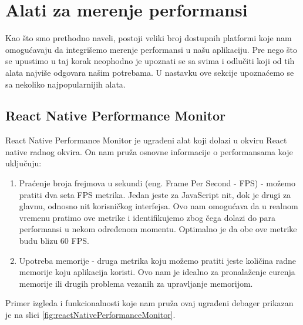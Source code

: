 \documentclass[12pt,oneside]{memoir}
\begin{document}
\section{Alati za merenje performansi}

Kao što smo prethodno naveli, postoji veliki broj dostupnih platformi koje nam omogućavaju da integrišemo merenje performansi u našu aplikaciju. Pre nego što se upustimo u taj korak neophodno je upoznati se sa svima i odlučiti koji od tih alata najviše odgovara našim potrebama. U nastavku ove sekcije upoznaćemo se sa nekoliko najpopularnijih alata.

\subsection{React Native Performance Monitor}

React Native Performance Monitor je ugrađeni alat koji dolazi u okviru React native radnog okvira. On nam pruža osnovne informacije o performansama koje uključuju:

\begin{enumerate}
    \item Praćenje broja frejmova u sekundi (eng. Frame Per Second - FPS) - možemo pratiti dva seta FPS metrika. Jedan jeste za JavaScript nit, dok je drugi za glavnu, odnosno nit korisničkog interfejsa. Ovo nam omogućava da u realnom vremenu pratimo ove metrike i identifikujemo zbog čega dolazi do para performansi u nekom određenom momentu. Optimalno je da obe ove metrike budu blizu 60 FPS.
    \item Upotreba memorije - druga metrika koju možemo pratiti jeste količina radne memorije koju aplikacija koristi. Ovo nam je idealno za pronalaženje curenja memorije ili drugih problema vezanih za upravljanje memorijom.
\end{enumerate}

Primer izgleda i funkcionalnosti koje nam pruža ovaj ugrađeni debager prikazan je na slici \ref{fig:reactNativePerformanceMonitor}.
\end{document}
